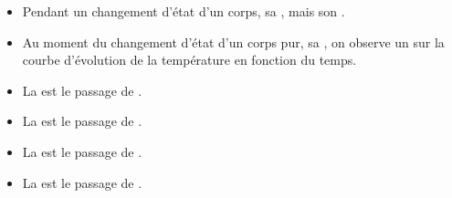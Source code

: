 \begin{mybilan}
	\begin{itemize}
		\item Pendant un changement d'état d'un corps, sa , mais son .
		\item Au moment du changement d'état d'un corps pur, sa , on observe un  sur la courbe d'évolution de la température en fonction du temps.
		\item La  est le passage de .
		\item La  est le passage de .
		\item La  est le passage de .
		\item La  est le passage de .
		
	\end{itemize}


\end{mybilan}